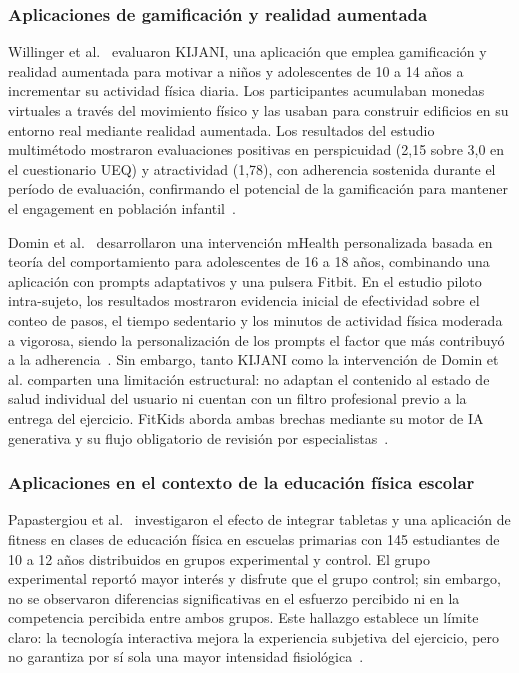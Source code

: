 			\subsubsection{Aplicaciones de gamificación y realidad aumentada}
				Willinger et al.~\cite{Willinger2024} evaluaron KIJANI, una aplicación que emplea gamificación y realidad aumentada para motivar a niños y adolescentes de 10 a 14 años a incrementar su actividad física diaria. Los participantes acumulaban monedas virtuales a través del movimiento físico y las usaban para construir edificios en su entorno real mediante realidad aumentada. Los resultados del estudio multimétodo mostraron evaluaciones positivas en perspicuidad (2,15 sobre 3,0 en el cuestionario UEQ) y atractividad (1,78), con adherencia sostenida durante el período de evaluación, confirmando el potencial de la gamificación para mantener el engagement en población infantil~\cite{Willinger2024}.
				
				Domin et al.~\cite{Domin2022} desarrollaron una intervención mHealth personalizada basada en teoría del comportamiento para adolescentes de 16 a 18 años, combinando una aplicación con prompts adaptativos y una pulsera Fitbit. En el estudio piloto intra-sujeto, los resultados mostraron evidencia inicial de efectividad sobre el conteo de pasos, el tiempo sedentario y los minutos de actividad física moderada a vigorosa, siendo la personalización de los prompts el factor que más contribuyó a la adherencia~\cite{Domin2022}. Sin embargo, tanto KIJANI como la intervención de Domin et al. comparten una limitación estructural: no adaptan el contenido al estado de salud individual del usuario ni cuentan con un filtro profesional previo a la entrega del ejercicio. FitKids aborda ambas brechas mediante su motor de IA generativa y su flujo obligatorio de revisión por especialistas~\cite{Zaleski2026,Dergaa2024}.
			
			\subsubsection{Aplicaciones en el contexto de la educación física escolar}
				Papastergiou et al.~\cite{Papastergiou2021} investigaron el efecto de integrar tabletas y una aplicación de fitness en clases de educación física en escuelas primarias con 145 estudiantes de 10 a 12 años distribuidos en grupos experimental y control. El grupo experimental reportó mayor interés y disfrute que el grupo control; sin embargo, no se observaron diferencias significativas en el esfuerzo percibido ni en la competencia percibida entre ambos grupos. Este hallazgo establece un límite claro: la tecnología interactiva mejora la experiencia subjetiva del ejercicio, pero no garantiza por sí sola una mayor intensidad fisiológica~\cite{Papastergiou2021}.
				
